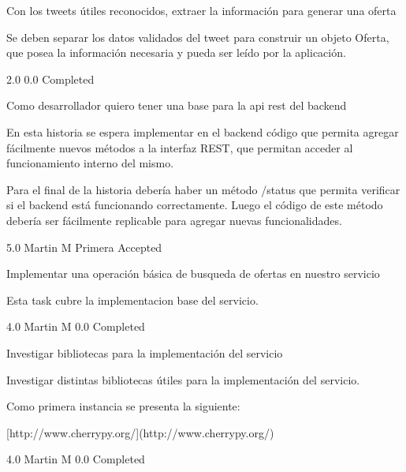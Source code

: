 		{Con los tweets útiles reconocidos, extraer la información para generar una oferta} %
		{Se deben separar los datos validados del tweet para construir un objeto
Oferta, que posea la información necesaria y pueda ser leído por la
aplicación.

} %
		{2.0} %
		{} %
		{0.0} %
		{Completed} %


\vspace{20pt}

	{Como desarrollador quiero tener una base para la api rest del backend} %
	{En esta historia se espera implementar en el backend código que permita
agregar fácilmente nuevos métodos a la interfaz REST, que permitan acceder al
funcionamiento interno del mismo.

  

Para el final de la historia debería haber un método /status que permita
verificar si el backend está funcionando correctamente. Luego el código de
este método debería ser fácilmente replicable para agregar nuevas
funcionalidades.

} %
	{} %
	{5.0} %
	{Martin M} %
	{Primera} %
	{Accepted} %

		{Implementar una operación básica de busqueda de ofertas en nuestro servicio} %
		{Esta task cubre la implementacion base del servicio.

} %
		{4.0} %
		{Martin M} %
		{0.0} %
		{Completed} %

		{Investigar bibliotecas para la implementación del servicio} %
		{Investigar distintas bibliotecas útiles para la implementación del servicio.

Como primera instancia se presenta la siguiente:

  

[http://www.cherrypy.org/](http://www.cherrypy.org/)

} %
		{4.0} %
		{Martin M} %
		{0.0} %
		{Completed} %


\vspace{20pt}

